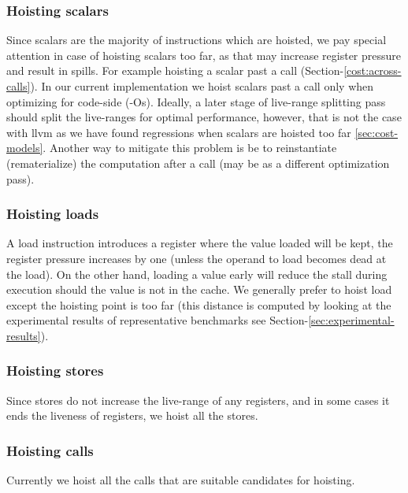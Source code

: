 \documentclass{sig-alternate}
\begin{document}
\subsubsection{Hoisting scalars}
Since scalars are the majority of instructions which are hoisted, we pay special
attention in case of hoisting scalars too far, as that may increase register
pressure and result in spills. For example hoisting a scalar past a call
(Section-\ref{cost:across-calls}).  In our current implementation we hoist
scalars past a call only when optimizing for code-side (-Os). Ideally, a later
stage of live-range splitting pass should split the live-ranges for optimal
performance, however, that is not the case with llvm as we have found
regressions when scalars are hoisted too far \ref{sec:cost-models}. Another way
to mitigate this problem is be to reinstantiate (rematerialize) the computation
after a call (may be as a different optimization pass).

\subsubsection{Hoisting loads}
A load instruction introduces a register where the value loaded will be kept,
the register pressure increases by one (unless the operand to load becomes dead
at the load). On the other hand, loading a value early will reduce the stall
during execution should the value is not in the cache. We generally prefer to
hoist load except the hoisting point is too far (this distance is computed by
looking at the experimental results of representative benchmarks see
Section-\ref{sec:experimental-results}).

\subsubsection{Hoisting stores}
Since stores do not increase the live-range of any registers, and in some cases
it ends the liveness of registers, we hoist all the stores.

\subsubsection{Hoisting calls}
Currently we hoist all the calls that are suitable candidates for hoisting.
\end{document}
